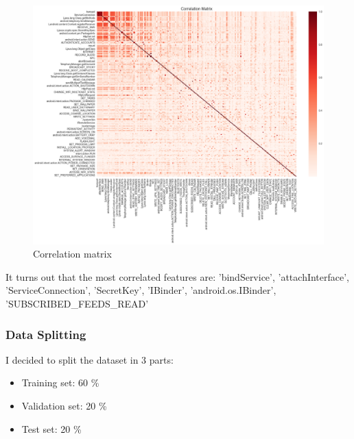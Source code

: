 \documentclass[unicode,11pt,a4paper,oneside,numbers=endperiod,openany]{scrartcl}
\begin{document}
\begin{figure}[H]
  \includegraphics[scale=0.4]{images/CORRMATRIX.png}
  \centering
  \caption{Correlation matrix}
  \label{fig:corr}
\end{figure}
It turns out that the most correlated features are:
'bindService', 'attachInterface', 'ServiceConnection', 'SecretKey', 'IBinder', 'android.os.IBinder', 'SUBSCRIBED\_FEEDS\_READ'\\

\subsubsection*{Data Splitting}
I decided to split the dataset in 3 parts:
\begin{itemize}
  \item Training set: 60 \%
  \item Validation set: 20 \%
  \item Test set: 20 \%
\end{itemize}
\end{document}
